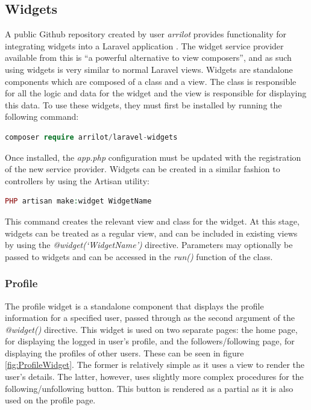 \subsection{Widgets}
A public Github repository created by user \textit{arrilot} provides functionality for integrating widgets into a Laravel application \cite{Packagist:LaravelWidgets}. The widget service provider available from this is ``a powerful alternative to view composers'', and as such using widgets is very similar to normal Laravel views. Widgets are standalone components which are composed of a class and a view. The class is responsible for all the logic and data for the widget and the view is responsible for displaying this data. To use these widgets, they must first be installed by running the following command:

\begin{lstlisting}[language=php]
 composer require arrilot/laravel-widgets
\end{lstlisting}

Once installed, the \textit{app.php} configuration must be updated with the registration of the new service provider. Widgets can be created in a similar fashion to controllers by using the Artisan utility:

\begin{lstlisting}[language=php]
 PHP artisan make:widget WidgetName
\end{lstlisting}

This command creates the relevant view and class for the widget. At this stage, widgets can be treated as a regular view, and can be included in existing views by using the \textit{@widget(`WidgetName')} directive. Parameters may optionally be passed to widgets and can be accessed in the \textit{run()} function of the class.

\subsubsection{Profile}
The profile widget is a standalone component that displays the profile information for a specified user, passed through as the second argument of the \textit{@widget()} directive. This widget is used on two separate pages: the home page, for displaying the logged in user's profile, and the followers/following page, for displaying the profiles of other users. These can be seen in figure \ref{fig:ProfileWidget}. The former is relatively simple as it uses a view to render the user's details. The latter, however, uses slightly more complex procedures for the following/unfollowing button. This button is rendered as a partial as it is also used on the profile page.

